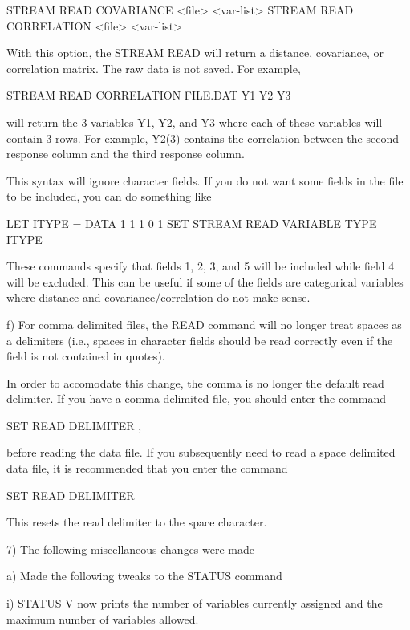                 STREAM READ COVARIANCE  <file> <var-list>
                STREAM READ CORRELATION <file> <var-list>

             With this option, the STREAM READ will return a distance,
             covariance, or correlation matrix.  The raw data is not
             saved.  For example,

                 STREAM READ CORRELATION FILE.DAT Y1 Y2 Y3

             will return the 3 variables Y1, Y2, and Y3 where each of
             these variables will contain 3 rows.  For example, Y2(3)
             contains the correlation between the second response column
             and the third response column.

             This syntax will ignore character fields.  If you do not
             want some fields in the file to be included, you can do
             something like

                 LET ITYPE = DATA 1 1 1 0 1
                 SET STREAM READ VARIABLE TYPE ITYPE

             These commands specify that fields 1, 2, 3, and 5 will be
             included while field 4 will be excluded.  This can be useful
             if some of the fields are categorical variables where
             distance and covariance/correlation do not make sense.
 
    f) For comma delimited files, the READ command will no longer treat
       spaces as a delimiters (i.e., spaces in character fields should be
       read correctly even if the field is not contained in quotes).

       In order to accomodate this change, the comma is no longer the
       default read delimiter.  If you have a comma delimited file, you
       should enter the command

           SET READ DELIMITER ,

       before reading the data file.  If you subsequently need to read
       a space delimited data file, it is recommended that you enter the
       command

           SET READ DELIMITER

       This resets the read delimiter to the space character.

 7) The following miscellaneous changes were made

    a) Made the following tweaks to the STATUS command

        i) STATUS V now prints the number of variables currently
           assigned and the maximum number of variables allowed.

